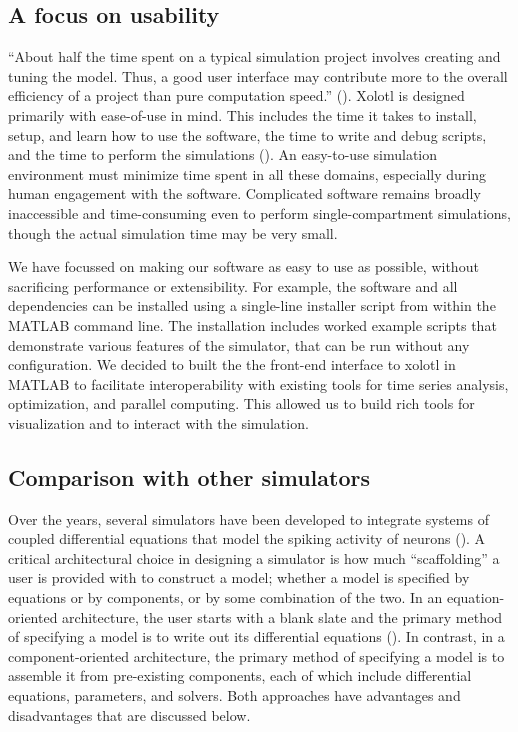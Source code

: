 \documentclass{frontiersSCNS} %
\begin{document}
\subsection{A focus on usability}

``About half the time spent on a typical simulation project involves creating and tuning the model. Thus, a good user interface may contribute more to the overall efficiency of a project than pure computation speed.'' (\cite{deschutterConsumerGuideNeuronal1992}). Xolotl is designed primarily with ease-of-use in mind. This includes the time it takes to install, setup, and learn how to use the software, the time to write and debug scripts, and the time to perform the simulations (\cite{rudolph2007much}). An easy-to-use simulation environment must minimize time spent in all these domains, especially during human engagement with the software. Complicated software remains broadly inaccessible and time-consuming even to perform single-compartment simulations, though the actual simulation time may be very small. 

We have focussed on making our software as easy to use as possible, without sacrificing performance or extensibility. For example, the software and all dependencies can be installed using a single-line installer script from within the MATLAB command line. The installation includes worked example scripts that demonstrate various features of the simulator, that can be run without any configuration.  We decided to built the the front-end interface to xolotl in MATLAB to facilitate interoperability with existing tools for time series analysis, optimization, and parallel computing. This allowed us to build rich tools for visualization and to interact with the simulation. 

\subsection{Comparison with other simulators}

Over the years, several simulators have been developed to integrate systems of coupled differential equations that model the spiking activity of neurons (\cite{bretteSimulationNetworksSpiking2007, sherfeyDynaSimMATLABToolbox2018, vitayANNarchyCodeGeneration2015, delormeSpikeNETEventdrivenSimulation2003, hinesNEURONSimulationEnvironment1997, bower2003genesis}). A critical architectural choice in designing a simulator is how much ``scaffolding'' a user is provided with to construct a model; whether a model is specified by equations or by components, or by some combination of the two. In an equation-oriented architecture, the user starts with a blank slate and the primary method of specifying a model is to write out its differential equations (\cite{stimberg2014equation}). In contrast, in a component-oriented architecture, the primary method of specifying a model is to assemble it from pre-existing components, each of which include differential equations, parameters, and solvers. Both approaches have advantages and disadvantages that are discussed below. 
\end{document}
